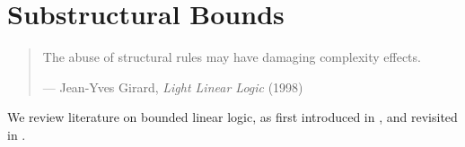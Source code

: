 \chapter{Substructural Bounds}

\begin{quotation}

\footnotesize\sffamily\itshape

\begin{flushright}

The abuse of structural rules may have damaging complexity effects.

\smallbreak

\upshape

--- Jean-Yves Girard, {\itshape Light Linear Logic} (1998)

\end{flushright}

\end{quotation}

We review literature on bounded linear logic, as first introduced in
\cite{girard-scedorov-scott-1992}, and revisited in
\cite{dal-lago-hofmann-2010}.
